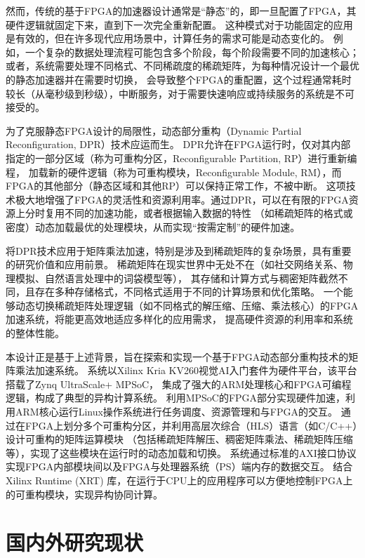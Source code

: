 然而，传统的基于FPGA的加速器设计通常是“静态”的，即一旦配置了FPGA，其硬件逻辑就固定下来，直到下一次完全重新配置。
这种模式对于功能固定的应用是有效的，但在许多现代应用场景中，计算任务的需求可能是动态变化的。
例如，一个复杂的数据处理流程可能包含多个阶段，每个阶段需要不同的加速核心；
或者，系统需要处理不同格式、不同稀疏度的稀疏矩阵，为每种情况设计一个最优的静态加速器并在需要时切换，
会导致整个FPGA的重配置，这个过程通常耗时较长（从毫秒级到秒级），中断服务，对于需要快速响应或持续服务的系统是不可接受的\cite{blodget2003self}。

为了克服静态FPGA设计的局限性，动态部分重构（Dynamic Partial Reconfiguration, DPR）技术应运而生\cite{xilinx2024vivado,vipin2018fpga}。
DPR允许在FPGA运行时，仅对其内部指定的一部分区域（称为可重构分区，Reconfigurable Partition, RP）进行重新编程，
加载新的硬件逻辑（称为可重构模块，Reconfigurable Module, RM），而FPGA的其他部分（静态区域和其他RP）可以保持正常工作，不被中断\cite{beckhoff2012go,koch2012partial}。
这项技术极大地增强了FPGA的灵活性和资源利用率。通过DPR，可以在有限的FPGA资源上分时复用不同的加速功能，或者根据输入数据的特性
（如稀疏矩阵的格式或密度）动态加载最优的处理模块，从而实现“按需定制”的硬件加速。

将DPR技术应用于矩阵乘法加速，特别是涉及到稀疏矩阵的复杂场景，具有重要的研究价值和应用前景。
稀疏矩阵在现实世界中无处不在（如社交网络关系、物理模拟、自然语言处理中的词袋模型等），
其存储和计算方式与稠密矩阵截然不同，且存在多种存储格式，不同格式适用于不同的计算场景和优化策略\cite{saad2003iterative}。
一个能够动态切换稀疏矩阵处理逻辑（如不同格式的解压缩、压缩、乘法核心）的FPGA加速系统，将能更高效地适应多样化的应用需求，
提高硬件资源的利用率和系统的整体性能。

本设计正是基于上述背景，旨在探索和实现一个基于FPGA动态部分重构技术的矩阵乘法加速系统。
系统以Xilinx Kria KV260视觉AI入门套件为硬件平台，该平台搭载了Zynq UltraScale+ MPSoC，
集成了强大的ARM处理核心和FPGA可编程逻辑，构成了典型的异构计算系统\cite{xilinx2024kv260}。
利用MPSoC的FPGA部分实现硬件加速，利用ARM核心运行Linux操作系统进行任务调度、资源管理和与FPGA的交互。
通过在FPGA上划分多个可重构分区，并利用高层次综合（HLS）语言（如C/C++）设计可重构的矩阵运算模块
（包括稀疏矩阵解压、稠密矩阵乘法、稀疏矩阵压缩等），实现了这些模块在运行时的动态加载和切换。
系统通过标准的AXI接口协议实现FPGA内部模块间以及FPGA与处理器系统（PS）端内存的数据交互。
结合Xilinx Runtime (XRT) 库，在运行于CPU上的应用程序可以方便地控制FPGA上的可重构模块，实现异构协同计算。

\section{国内外研究现状}

